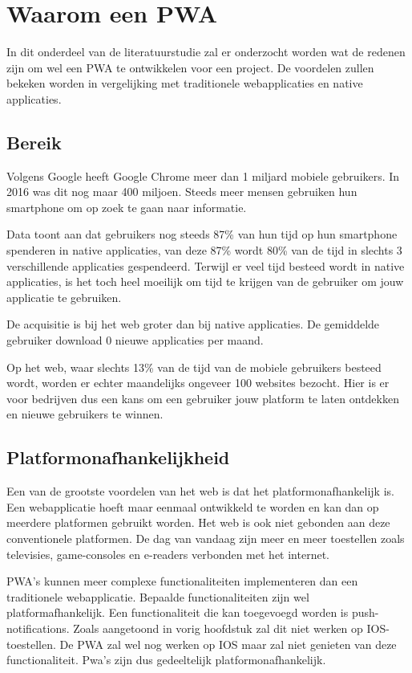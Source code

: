 \clearpage
\section{Waarom een PWA}

In dit onderdeel van de literatuurstudie zal er onderzocht worden wat de redenen zijn om wel een PWA te ontwikkelen voor een project. De voordelen zullen bekeken worden in vergelijking met traditionele webapplicaties en native applicaties.
\autocite{TandelSunil2018}


\subsection{Bereik}
	Volgens Google heeft Google Chrome meer dan 1 miljard mobiele gebruikers. In 2016 was dit nog maar 400 miljoen. Steeds meer mensen gebruiken hun smartphone om op zoek te gaan naar informatie. 
	\autocite{Nath2017}
	
	Data toont aan dat gebruikers nog steeds 87\% van hun tijd op hun smartphone spenderen in native applicaties, van deze 87\% wordt 80\% van de tijd in slechts 3 verschillende applicaties gespendeerd. Terwijl er veel tijd besteed wordt in native applicaties, is het toch heel moeilijk om tijd te krijgen van de gebruiker om jouw applicatie te gebruiken.
	
	De acquisitie is bij het web groter dan bij native applicaties. De gemiddelde gebruiker download 0 nieuwe applicaties per maand. 
	
	Op het web, waar slechts 13\% van de tijd van de mobiele gebruikers besteed wordt, worden er echter maandelijks ongeveer 100 websites bezocht. Hier is er voor bedrijven dus een kans om een gebruiker jouw platform te laten ontdekken en nieuwe gebruikers te winnen.
	\autocite{GoogleChromeDevelopers2017}
	

\subsection{Platformonafhankelijkheid }
	Een van de grootste voordelen van het web is dat het platformonafhankelijk is. Een webapplicatie hoeft maar eenmaal ontwikkeld te worden en kan dan op meerdere platformen gebruikt worden. Het web is ook niet gebonden aan deze conventionele platformen. De dag van vandaag zijn meer en meer toestellen zoals televisies, game-consoles en e-readers verbonden met het internet. 
	
	PWA's kunnen meer complexe functionaliteiten implementeren dan een traditionele webapplicatie. Bepaalde functionaliteiten zijn wel platformafhankelijk. Een functionaliteit die kan toegevoegd worden is push-notifications. Zoals aangetoond in vorig hoofdstuk zal dit niet werken op IOS-toestellen. De PWA zal wel nog werken op IOS maar zal niet genieten van deze functionaliteit. Pwa's zijn dus gedeeltelijk platformonafhankelijk.
	

